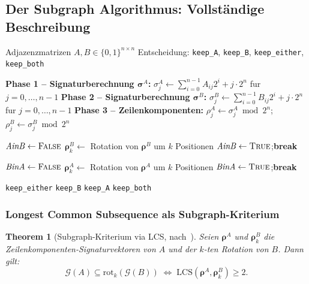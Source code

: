 \documentclass[a4paper, 12pt, twoside, openright]{report}
\newtheorem{theorem}{Theorem}[section]
\theoremstyle{definition}
\theoremstyle{definition}
\begin{document}
\subsection{Der Subgraph Algorithmus: Vollständige Beschreibung}

\begin{algorithm}[H]
\caption{Subgraph Algorithmus~\citep{epp2026subgraph}}
\label{alg:subgraph}
\begin{algorithmic}[1]
\Require Adjazenzmatrizen $A, B \in \{0,1\}^{n \times n}$
\Ensure Entscheidung: \texttt{keep\_A}, \texttt{keep\_B}, \texttt{keep\_either}, \texttt{keep\_both}

\State \textbf{Phase 1 -- Signaturberechnung $\bm{\sigma}^A$:}
  $\sigma_j^A \gets \sum_{i=0}^{n-1} A_{ij} 2^i + j \cdot 2^n$ fur $j=0,\ldots,n{-}1$
\State \textbf{Phase 2 -- Signaturberechnung $\bm{\sigma}^B$:}
  $\sigma_j^B \gets \sum_{i=0}^{n-1} B_{ij} 2^i + j \cdot 2^n$ fur $j=0,\ldots,n{-}1$
\State \textbf{Phase 3 -- Zeilenkomponenten:}
  $\rho_j^A \gets \sigma_j^A \bmod 2^n$;\quad $\rho_j^B \gets \sigma_j^B \bmod 2^n$

\State $\mathit{AinB} \gets \textsc{False}$
  \State $\bm{\rho}^B_k \gets$ Rotation von $\bm{\rho}^B$ um $k$ Positionen
    \State $\mathit{AinB} \gets \textsc{True}$;\quad \textbf{break}
  \EndIf
\EndFor

\State $\mathit{BinA} \gets \textsc{False}$
  \State $\bm{\rho}^A_k \gets$ Rotation von $\bm{\rho}^A$ um $k$ Positionen
    \State $\mathit{BinA} \gets \textsc{True}$;\quad \textbf{break}
  \EndIf
\EndFor

 \Return \texttt{keep\_either}
 \Return \texttt{keep\_B}
 \Return \texttt{keep\_A}
\Else{} \Return \texttt{keep\_both}
\EndIf
\end{algorithmic}
\end{algorithm}

\subsubsection{Longest Common Subsequence als Subgraph-Kriterium}

\begin{theorem}[Subgraph-Kriterium via LCS, nach~\citep{epp2026subgraph}]
\label{thm:lcs_kriterium}
Seien $\bm{\rho}^A$ und $\bm{\rho}^B_k$ die Zeilenkomponenten-Signaturvektoren
von $A$ und der $k$-ten Rotation von $B$. Dann gilt:
\begin{equation}
  \mathcal{G}(A) \subseteq \mathrm{rot}_k(\mathcal{G}(B))
  \;\Longleftrightarrow\;
  \mathrm{LCS}(\bm{\rho}^A, \bm{\rho}^B_k) \geq 2.
  \label{eq:lcs_kriterium}
\end{equation}
\end{theorem}
\end{document}
